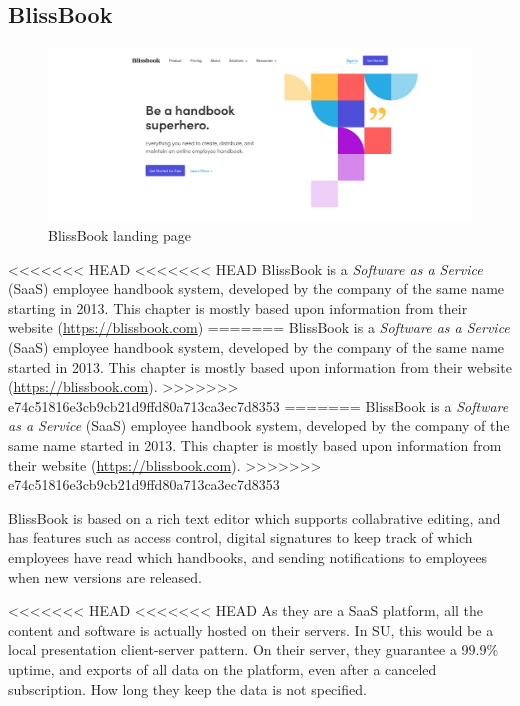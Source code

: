 \subsection{BlissBook}
\begin{figure}[h]
	\includegraphics[width=1\textwidth]{billeder/BlissBooks.png}
	\caption{BlissBook landing page}
\end{figure}
<<<<<<< HEAD
<<<<<<< HEAD
BlissBook is a \textit{Software as a Service} (SaaS) employee handbook system, developed by the company of the same name starting in 2013. %
This chapter is mostly based upon information from their website (\url{https://blissbook.com})
=======
BlissBook is a \textit{Software as a Service} (SaaS) employee handbook system, developed by the company of the same name started in 2013. %
This chapter is mostly based upon information from their website (\url{https://blissbook.com}).
>>>>>>> e74c51816e3cb9cb21d9ffd80a713ca3ec7d8353
=======
BlissBook is a \textit{Software as a Service} (SaaS) employee handbook system, developed by the company of the same name started in 2013. %
This chapter is mostly based upon information from their website (\url{https://blissbook.com}).
>>>>>>> e74c51816e3cb9cb21d9ffd80a713ca3ec7d8353


BlissBook is based on a rich text editor which supports collabrative editing, and has features such as access control, digital signatures to keep track of which employees have read which handbooks, and sending notifications to employees when new versions are released.

<<<<<<< HEAD
<<<<<<< HEAD
As they are a SaaS platform, all the content and software is actually hosted on their servers. In SU, this would be a local presentation client-server pattern.
On their server, they guarantee a 99.9\% uptime, and exports of all data on the platform, even after a canceled subscription. How long they keep the data is not specified.


